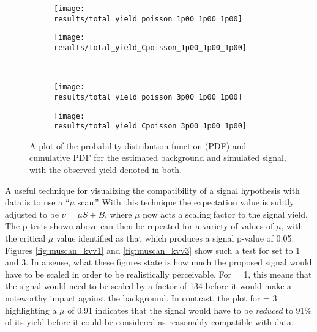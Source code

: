     \begin{figure}
        \centering
        \begin{subfigure}{0.48\textwidth} 
            \texttt{[image: results/total\_yield\_poisson\_1p00\_1p00\_1p00]}
            \caption{}%
            \label{fig:poisson_sig_kvv1_pdf}
        \end{subfigure}
        \begin{subfigure}{0.48\textwidth}
            \texttt{[image: results/total\_yield\_Cpoisson\_1p00\_1p00\_1p00]}
            \caption{}%
            \label{fig:poisson_sig_kvv1_Cpdf}
        \end{subfigure}\\
        \begin{subfigure}{0.48\textwidth} 
            \texttt{[image: results/total\_yield\_poisson\_3p00\_1p00\_1p00]}
            \caption{}%
            \label{fig:poisson_sig_kvv3_pdf}
        \end{subfigure}
        \begin{subfigure}{0.48\textwidth}
            \texttt{[image: results/total\_yield\_Cpoisson\_3p00\_1p00\_1p00]}
            \caption{}%
            \label{fig:poisson_sig_kvv3_Cpdf}
        \end{subfigure}
        \caption{
            A plot of the probability distribution function (PDF)
                and cumulative PDF for the estimated background and simulated signal,
                with the observed yield denoted in both.
        }
    \end{figure}

    A useful technique for visualizing the compatibility of a signal hypothesis with data is to use a ``$\mu$ scan.''
    With this technique the expectation value is subtly adjusted to be $\nu = \mu S + B$,
        where $\mu$ now acts a scaling factor to the signal yield.
    The p-tests shown above can then be repeated for a variety of values of $\mu$,
        with the critical $\mu$ value identified as that which produces a signal p-value of 0.05.
    Figures \ref{fig:muscan_kvv1} and \ref{fig:muscan_kvv3} show such a test for \kvv set to 1 and 3.
    In a sense, what these figures state is how much the proposed signal would have to be scaled in order to be realistically perceivable.
    For \kvv = 1, this means that the signal would need to be scaled by a factor of 134 before it would make a noteworthy impact against the background.
    In contrast, the plot for \kvv = 3 highlighting a $\mu$ of 0.91 indicates
        that the signal would have to be \textit{reduced} to 91\% of its yield before it could be considered as reasonably compatible with data.

